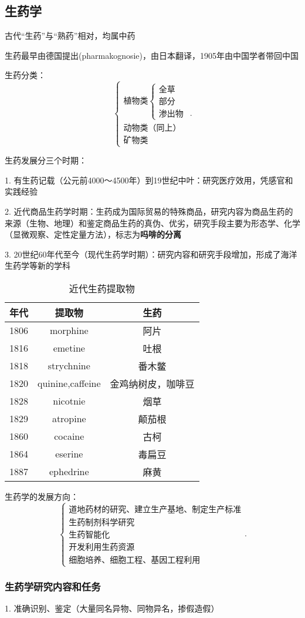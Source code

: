 \subsection{生药学}%
\label{sub:生药学}
\begin{notation}
    古代“生药”与“熟药”相对，均属中药
\end{notation}
生药最早由德国提出(pharmakognosie)，由日本翻译，1905年由中国学者带回中国

生药分类：\[
    \begin{cases}
        \mbox{植物类}\begin{cases}
            \mbox{全草}\\ 
            \mbox{部分}\\ 
            \mbox{渗出物}
        \end{cases}\\ 
        \mbox{动物类（同上）}\\ 
        \mbox{矿物类}
    \end{cases}
.\] 

\begin{notation}
    生药发展分三个时期：

    1. 有生药记载（公元前4000～4500年）到19世纪中叶：研究医疗效用，凭感官和实践经验

    2. 近代商品生药学时期：生药成为国际贸易的特殊商品，研究内容为商品生药的来源（生物、地理）和鉴定商品生药的真伪、优劣，研究手段主要为形态学、化学（显微观察、定性定量方法），标志为\textbf{吗啡的分离}

    3. 20世纪60年代至今（现代生药学时期）：研究内容和研究手段增加，形成了海洋生药学等新的学科
\end{notation}
\begin{table}[htpb]
    \centering
    \caption{近代生药提取物}
    \label{tab:近代生药提取物}
    \begin{tabular}{ccc}
    \toprule
    年代 & 提取物 & 生药 \\
    \midrule
    1806 & morphine & 阿片 \\
    1816 & emetine & 吐根\\
    1818 & strychnine & 番木鳖\\
    1820 & quinine,caffeine & 金鸡纳树皮，咖啡豆\\
    1828 & nicotnie & 烟草\\
    1829 & atropine & 颠茄根\\
    1860 & cocaine & 古柯\\
    1864 & eserine & 毒扁豆\\
    1887 & ephedrine & 麻黄\\
    \bottomrule
    \end{tabular}
\end{table}
生药学的发展方向：
\[
    \begin{cases}
        \mbox{道地药材的研究、建立生产基地、制定生产标准}\\ 
        \mbox{生药制剂科学研究}\\ 
        \mbox{生药智能化}\\ 
        \mbox{开发利用生药资源}\\ 
        \mbox{细胞培养、细胞工程、基因工程利用}
    \end{cases}
.\] 
\subsubsection*{生药学研究内容和任务}%
\label{subsub:生药学研究内容和任务}
1. 准确识别、鉴定（大量同名异物、同物异名，掺假造假）
